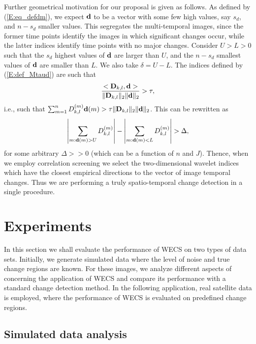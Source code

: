 \documentclass[journal]{IEEEtran}
\newcommand{\vD}{{\textbf D}}
\newcommand{\vd}{{\textbf d}}
\begin{document}
Further geometrical motivation for our proposal is given as follows. As defined by (\ref{E:eq_defdm}), we expect $\vd$ to be a vector with some few high values, say $s_d$, and $n-s_d$ smaller values. This segregates the multi-temporal images, since the former time points identify the images in which significant changes occur, while the latter indices identify time points with no major changes. Consider $U>L>0$ such that the $s_d$ highest values of $\vd$ are larger than $U$, and the $n-s_d$ smallest values of $\vd$ are smaller than $L$. We also take $\delta=U-L$. The indices defined by  (\ref{E:def_Mtaud}) are such that   
\[
\frac{<\vD_{k,l},\vd>}{\|\vD_{k,l}\|_2\|\vd\|_2}>\tau,
\]
i.e., such that  $\sum_{m=1}^nD_{k,l}^{(m)}\vd(m)>\tau\|\vD_{k,l}\|_2\|\vd\|_2$. This can be rewritten as
\[
\left|\sum_{m:\vd(m)>U} D_{k,l}^{(m)}\right|-\left|\sum_{m:\vd(m)<L} D_{k,l}^{(m)}\right|>\Delta,
\]
for some arbitrary $\Delta>>0$ (which can be a function of $n$ and $J$). Thence, when we employ correlation screening we select the two-dimensional wavelet indices which have the closest empirical directions to the vector of image temporal changes. Thus we are performing a truly spatio-temporal change detection in a single procedure.



\section{Experiments}

In this section we shall evaluate the performance of WECS on two types of data sets. Initially, we generate simulated data where the level of noise and true change regions are known. For these images, we analyze different aspects of concerning the application of WECS and compare its performance with a standard change detection method. In the following application, real satellite data is employed, where the performance of WECS is evaluated on predefined change regions.

\subsection{Simulated data analysis}\label{secExpSimulated}
\end{document}

